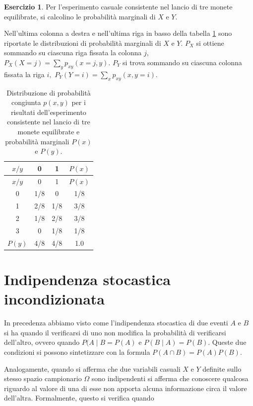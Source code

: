 \documentclass[
  11pt,
]{krantz}
\theoremstyle{definition}
\theoremstyle{definition}
\theoremstyle{definition}
\newtheorem{exercise}{Esercizio}[chapter]
\theoremstyle{definition}
\theoremstyle{remark}
\begin{document}
\begin{exercise}

Per l'esperimento casuale consistente nel lancio di tre monete equilibrate, si calcolino le probabilità marginali di \(X\) e \(Y\).

Nell'ultima colonna a destra e nell'ultima riga in basso della tabella \ref{tab:ditr-cong-biv} sono riportate le distribuzioni di probabilità marginali di \(X\) e \(Y\). \(P_X\) si ottiene sommando su ciascuna riga fissata la colonna \(j\), \(P_X(X = j) = \sum_y p_{xy}(x = j, y)\). \(P_Y\) si trova sommando su ciascuna colonna fissata la riga \(i,\) \(P_Y (Y = i) = \sum_x p_{xy}(x, y = i)\).

\begin{longtable}[]{@{}cccc@{}}
\caption{\label{tab:ditr-cong-biv} Distribuzione di probabilità congiunta \(p(x,y)\) per i risultati dell'esperimento consistente nel lancio di tre monete equilibrate e probabilità marginali \(P(x)\) e \(P(y)\).}\tabularnewline
\toprule
\(x / y\) & 0 & 1 & \(P(x)\) \\
\midrule
\endfirsthead
\toprule
\(x / y\) & 0 & 1 & \(P(x)\) \\
\midrule
\endhead
0 & 1/8 & 0 & 1/8 \\
1 & 2/8 & 1/8 & 3/8 \\
2 & 1/8 & 2/8 & 3/8 \\
3 & 0 & 1/8 & 1/8 \\
\(P(y)\) & 4/8 & 4/8 & 1.0 \\
\bottomrule
\end{longtable}

\end{exercise}

\hypertarget{indipendenza-stocastica-incondizionata}{%
\section{Indipendenza stocastica incondizionata}\label{indipendenza-stocastica-incondizionata}}

In precedenza abbiamo visto come l'indipendenza stocastica di due eventi \(A\) e \(B\) si ha quando il verificarsi di uno non modifica la probabilità di verificarsi dell'altro, ovvero quando \(P(A \mid B = P(A)\) e \(P(B \mid A) = P(B)\). Queste due condizioni si possono sintetizzare con la formula \(P(A \cap B) = P(A) P(B)\).

Analogamente, quando si afferma che due variabili casuali \(X\) e \(Y\) definite sullo stesso spazio campionario \(\Omega\) sono indipendenti si afferma che conoscere qualcosa riguardo al valore di una di esse non apporta alcuna informazione circa il valore dell'altra. Formalmente, questo si verifica quando
\end{document}
